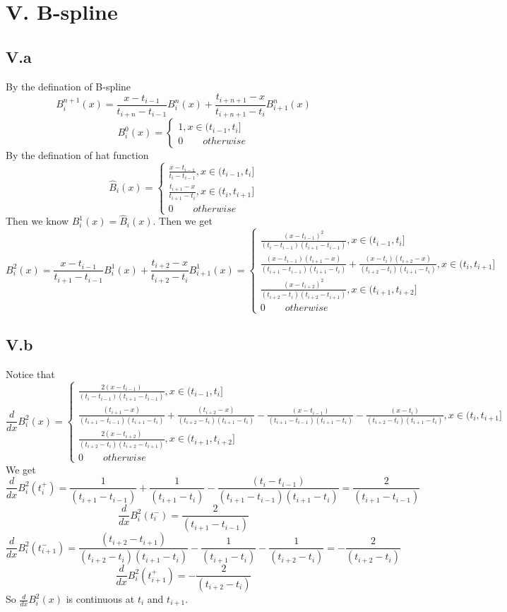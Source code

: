 \documentclass[a4paper]{article}
\begin{document}
\section*{V. B-spline}
\subsection*{V.a}
By the defination of B-spline
\[
B_i^{n+1}(x) = \frac{x-t_{i-1}}{t_{i+n}-t_{i-1}}B_i^n(x) +\frac{t_{i+n+1}-x}{t_{i+n+1}-t_i}B_{i+1}^n(x)
\]
\[
B_i^0(x) = \begin{cases}
1, x\in (t_{i-1},t_i] \\
0 \qquad otherwise
\end{cases}
\]
By the defination of hat function
\[
\hat{B}_i(x) = 
\begin{cases}
\frac{x-t_{i-1}}{t_i-t_{i-1}}, x\in (t_{i-1},t_i] \\
\frac{t_{i+1}-x}{t_{i+1}-t_{i}},x\in (t_{i},t_{i+1}] \\
0 \qquad otherwise
\end{cases}
\]
Then we know $B_i^1(x) = \hat{B}_i(x)$. Then we get 
\[
B_i^2(x) = \frac{x-t_{i-1}}{t_{i+1}-t_{i-1}}B_i^1(x) +\frac{t_{i+2}-x}{t_{i+2}-t_i}B_{i+1}^1(x) =
\begin{cases}
\frac{(x-t_{i-1})^2}{(t_i-t_{i-1})(t_{i+1}-t_{i-1})}, x\in (t_{i-1},t_i] \\
\frac{(x-t_{i-1})(t_{i+1}-x)}{(t_{i+1}-t_{i-1})(t_{i+1}-t_{i})}+\frac{(x-t_{i})(t_{i+2}-x)}{(t_{i+2}-t_{i})(t_{i+1}-t_{i})},x\in (t_{i},t_{i+1}] \\
\frac{(x-t_{i+2})^2}{(t_{i+2}-t_{i})(t_{i+2}-t_{i+1})},x\in (t_{i+1},t_{i+2}] \\
0 \qquad otherwise
\end{cases}
\]
\subsection*{V.b}
Notice that 
\[
\frac{d}{dx}B_i^2(x) = 
\begin{cases}
\frac{2(x-t_{i-1})}{(t_i-t_{i-1})(t_{i+1}-t_{i-1})}, x\in (t_{i-1},t_i] \\
\frac{(t_{i+1}-x)}{(t_{i+1}-t_{i-1})(t_{i+1}-t_{i})}+
\frac{(t_{i+2}-x)}{(t_{i+2}-t_{i})(t_{i+1}-t_{i})} - 
\frac{(x-t_{i-1})}{(t_{i+1}-t_{i-1})(t_{i+1}-t_{i})}-
\frac{(x-t_{i})}{(t_{i+2}-t_{i})(t_{i+1}-t_{i})},x\in (t_{i},t_{i+1}] \\
\frac{2(x-t_{i+2})}{(t_{i+2}-t_{i})(t_{i+2}-t_{i+1})},x\in (t_{i+1},t_{i+2}] \\
0 \qquad otherwise
\end{cases}
\]
We get 
\[
\frac{d}{dx}B_i^2(t_i^+) = \frac{1}{(t_{i+1}-t_{i-1})}+
\frac{1}{(t_{i+1}-t_{i})} - 
\frac{(t_i-t_{i-1})}{(t_{i+1}-t_{i-1})(t_{i+1}-t_{i})} = \frac{2}{(t_{i+1}-t_{i-1})}
\]
\[
\frac{d}{dx}B_i^2(t_i^-) = \frac{2}{(t_{i+1}-t_{i-1})}
\]
\[
\frac{d}{dx}B_i^2(t_{i+1}^-) = 
\frac{(t_{i+2}-t_{i+1})}{(t_{i+2}-t_{i})(t_{i+1}-t_{i})} - 
\frac{1}{(t_{i+1}-t_{i})}-
\frac{1}{(t_{i+2}-t_{i})}
= -\frac{2}{(t_{i+2}-t_{i})}
\]
\[
\frac{d}{dx}B_i^2(t_{i+1}^+) = -\frac{2}{(t_{i+2}-t_{i})}
\]
So $\frac{d}{dx}B_i^2(x)$ is continuous at $t_i$ and $t_{i+1}$.
\end{document}
